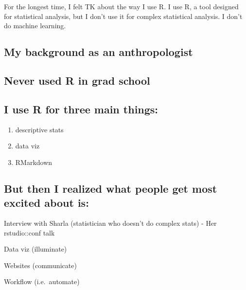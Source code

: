 \documentclass[
]{book}
\providecommand{\tightlist}{%
  \setlength{\itemsep}{0pt}\setlength{\parskip}{0pt}}
\begin{document}
For the longest time, I felt TK about the way I use R. I use R, a tool designed for statistical analysis, but I don't use it for complex statistical analysis. I don't do machine learning.

\hypertarget{my-background-as-an-anthropologist}{%
\subsection*{My background as an anthropologist}\label{my-background-as-an-anthropologist}}

\hypertarget{never-used-r-in-grad-school}{%
\subsection*{Never used R in grad school}\label{never-used-r-in-grad-school}}

\hypertarget{i-use-r-for-three-main-things}{%
\subsection*{I use R for three main things:}\label{i-use-r-for-three-main-things}}

\begin{enumerate}
\def\labelenumi{\arabic{enumi}.}
\tightlist
\item
  descriptive stats
\item
  data viz
\item
  RMarkdown
\end{enumerate}

\hypertarget{but-then-i-realized-what-people-get-most-excited-about-is}{%
\subsection*{But then I realized what people get most excited about is:}\label{but-then-i-realized-what-people-get-most-excited-about-is}}

Interview with Sharla (statistician who doesn't do complex stats)
- Her rstudio::conf talk

Data viz (illuminate)

Websites (communicate)

Workflow (i.e.~automate)
\end{document}
